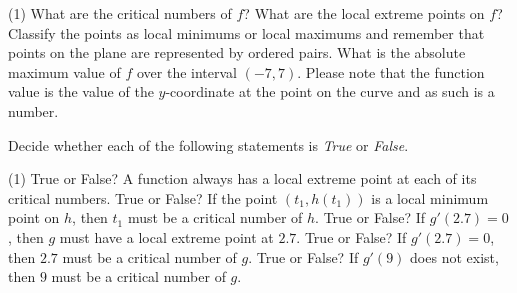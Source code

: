 \documentclass[10pt,oneside,]{book}
\theoremstyle{plain}
\theoremstyle{definition}
\numberwithin{equation}{section}
\newcounter{figstack}
\newcounter{figindex}
\newlength\fight
\newcommand\pushValignCaptionBottom[5][b]{%
\stepcounter{figstack}%
\expandafter\def\csname %
figalign\romannumeral\value{figstack}\endcsname{#1}%
\expandafter\def\csname %
figtype\romannumeral\value{figstack}\endcsname{#2}%
\expandafter\def\csname %
figwd\romannumeral\value{figstack}\endcsname{#3}%
\expandafter\def\csname %
figcontent\romannumeral\value{figstack}\endcsname{#4}%
\expandafter\def\csname %
figcap\romannumeral\value{figstack}\endcsname{#5}%
\setbox0=\hbox{%
\begin{#2}{#3}#4\end{#2}}%
\ifdim\dimexpr\ht0+\dp0\relax>\fight\global\setlength{\fight}{%
\dimexpr\ht0+\dp0\relax}\fi%
}
\newcommand\popValignCaptionBottom{%
\setcounter{figindex}{0}%
\hfill%
\whiledo{\value{figindex}<\value{figstack}}{%
\stepcounter{figindex}%
\def\tmp{\csname figwd\romannumeral\value{figindex}\endcsname}%
\begin{\csname figtype\romannumeral\value{figindex}\endcsname}[t]{\tmp}%
\centering%
\stackinset{c}{}%
{\csname figalign\romannumeral\value{figindex}\endcsname}{}%
{\csname figcontent\romannumeral\value{figindex}\endcsname}%
{\rule{0pt}{\fight}}\par%
\csname figcap\romannumeral\value{figindex}\endcsname%
\end{\csname figtype\romannumeral\value{figindex}\endcsname}%
\hfill%
}%
\setcounter{figstack}{0}%
\setlength{\fight}{0pt}%
\hfill%
}
\newcommand{\fe}[2]{#1\mathopen{}\left(#2\right)\mathclose{}}
\newcommand{\ointerval}[2]{\left(#1,#2\right)}
\newcommand{\point}[2]{\left(#1,#2\right)}
\newcommand{\fd}[1]{#1'}
\begin{document}
\par
\begin{exercisegroup}(1)
\exercise[2.]\hypertarget{exercise-564}{\null}What are the critical numbers of \(f\)?%
\exercise[3.]\hypertarget{exercise-565}{\null}What are the local extreme points on \(f\)?  Classify the points as local minimums or local maximums and remember that points on the plane are represented by ordered pairs.%
\exercise[4.]\hypertarget{exercise-566}{\null}What is the absolute maximum value of \(f\) over the interval \(\ointerval{-7}{7}\).  Please note that the function value is the value of the \(y\)-coordinate at the point on the curve and as such is a number.%
\end{exercisegroup}
\par\smallskip\noindent
Decide whether each of the following statements is \emph{True} or \emph{False}.%
\par
\begin{exercisegroup}(1)
\exercise[5.]\hypertarget{exercise-567}{\null}True or False? A function always has a local extreme point at each of its critical numbers.%
\exercise[6.]\hypertarget{exercise-568}{\null}True or False? If the point \(\point{t_1}{\fe{h}{t_1}}\) is a local minimum point on \(h\), then \(t_1\) must be a critical number of \(h\).%
\exercise[7.]\hypertarget{exercise-569}{\null}True or False? If \(\fe{\fd{g}}{2.7}=0\), then \(g\) must have a local extreme point at \(2.7\).%
\exercise[8.]\hypertarget{exercise-570}{\null}True or False? If \(\fe{\fd{g}}{2.7}=0\), then \(2.7\) must be a critical number of \(g\).%
\exercise[9.]\hypertarget{exercise-571}{\null}True or False? If \(\fe{\fd{g}}{9}\) does not exist, then \(9\) must be a critical number of \(g\).%
\end{exercisegroup}
\end{document}
